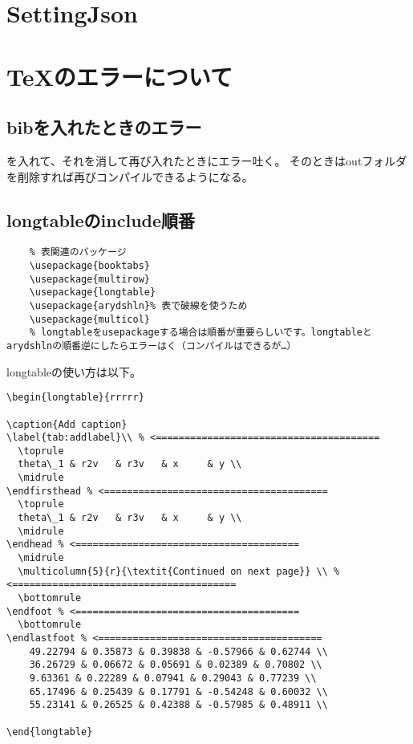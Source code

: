 \section{SettingJson}

\section{{\TeX}のエラーについて}

\subsection{bibを入れたときのエラー}
\verb||を入れて、それを消して再び入れたときにエラー吐く。
そのときはoutフォルダを削除すれば再びコンパイルできるようになる。

\subsection{longtableのinclude順番}
\begin{verbatim}
	% 表関連のパッケージ
	\usepackage{booktabs}
	\usepackage{multirow}
	\usepackage{longtable}
	\usepackage{arydshln}% 表で破線を使うため
	\usepackage{multicol}
	% longtableをusepackageする場合は順番が重要らしいです。longtableとarydshlnの順番逆にしたらエラーはく（コンパイルはできるが…）
\end{verbatim}

longtableの使い方は以下。
\begin{lstlisting}
\begin{longtable}{rrrrr} 

\caption{Add caption}
\label{tab:addlabel}\\ % <=======================================
  \toprule
  theta\_1 & r2v   & r3v   & x     & y \\
  \midrule  
\endfirsthead % <=======================================
  \toprule
  theta\_1 & r2v   & r3v   & x     & y \\
  \midrule  
\endhead % <=======================================
  \midrule 
  \multicolumn{5}{r}{\textit{Continued on next page}} \\ % <=======================================
  \bottomrule
\endfoot % <=======================================
  \bottomrule
\endlastfoot % <=======================================
    49.22794 & 0.35873 & 0.39838 & -0.57966 & 0.62744 \\
    36.26729 & 0.06672 & 0.05691 & 0.02389 & 0.70802 \\
    9.63361 & 0.22289 & 0.07941 & 0.29043 & 0.77239 \\
    65.17496 & 0.25439 & 0.17791 & -0.54248 & 0.60032 \\
    55.23141 & 0.26525 & 0.42388 & -0.57985 & 0.48911 \\

\end{longtable}
\end{lstlisting}


